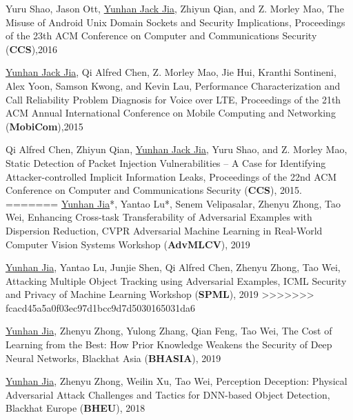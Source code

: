 \documentclass[margin]{res}
\begin{document}
\begin{resume}
Yuru Shao, Jason Ott, \underline{Yunhan Jack Jia}, Zhiyun Qian, and Z. Morley Mao,
The Misuse of Android Unix Domain Sockets and Security Implications, Proceedings of the 23th ACM Conference on Computer and Communications Security (\textbf{CCS}),2016 \href{http://web.eecs.umich.edu/\~jackjia/material/misuse\_ccs16.pdf}{\color{blue}{[PDF]}}

\underline{Yunhan Jack Jia}, Qi Alfred Chen, Z. Morley Mao, Jie Hui, Kranthi Sontineni, Alex Yoon, Samson Kwong, and Kevin Lau, Performance Characterization and Call Reliability Problem Diagnosis for Voice over LTE, Proceedings of the 21th ACM Annual International Conference on Mobile Computing and Networking (\textbf{MobiCom}),2015 \href{http://web.eecs.umich.edu/\~jackjia/material/performance\_mobicom15.pdf}{\color{blue}{[PDF]}}

Qi Alfred Chen, Zhiyun Qian, \underline{Yunhan Jack Jia}, Yuru Shao, and Z. Morley Mao, Static Detection of Packet Injection
Vulnerabilities -- A Case for Identifying Attacker-controlled Implicit Information Leaks, Proceedings of the 22nd ACM
Conference on Computer and Communications Security (\textbf{CCS}), 2015. \href{http://web.eecs.umich.edu/\~jackjia/material/static\_ccs15.pdf}{\color{blue}{[PDF]}}
=======
\underline{Yunhan Jia}*, Yantao Lu*, Senem Velipasalar, Zhenyu Zhong, Tao Wei, Enhancing Cross-task Transferability of Adversarial Examples with Dispersion Reduction, CVPR Adversarial Machine Learning in Real-World Computer Vision Systems Workshop (\textbf{AdvMLCV}), 2019 \href{https://arxiv.org/pdf/1905.03333.pdf}{\color{blue}{[PDF]}}


\underline{Yunhan Jia}, Yantao Lu, Junjie Shen, Qi Alfred Chen, Zhenyu Zhong, Tao Wei,
Attacking Multiple Object Tracking using Adversarial Examples, ICML Security and Privacy of Machine Learning Workshop (\textbf{SPML}), 2019 \href{https://github.com/jiayunhan/jiayunhan.github.io/blob/master/material/fooling_spml19.pdf}{\color{blue}{[Poster]}}
>>>>>>> fcacd45a5a0f03ec97d1bcc9d7d5030165031da6

\underline{Yunhan Jia}, Zhenyu Zhong, Yulong Zhang, Qian Feng, Tao Wei,
The Cost of Learning from the Best: How Prior Knowledge Weakens the Security of Deep Neural Networks, Blackhat Asia (\textbf{BHASIA}), 2019 \href{http://i.blackhat.com/asia-19/Thu-March-28/bh-asia-Jia-the-Cost-of-Learning-From-the-Best-How-Prior-Knowledge-Weakens-the-Security-of-Deep-Neural-Networks.pdf}{\color{blue}{[Slides]}}

\underline{Yunhan Jia}, Zhenyu Zhong, Weilin Xu, Tao Wei,
Perception Deception: Physical Adversarial Attack Challenges and Tactics for DNN-based Object Detection, Blackhat Europe (\textbf{BHEU}), 2018 \href{http://i.blackhat.com/eu-18/Thu-Dec-6/eu-18-Zhong-Perception-Deception-Physical-Adversarial-Attack-Challenges-and-Tactics-for-DNN-Based-Object-Detection.pdf}{\color{blue}{[Slides]}}


\end{resume}
\end{document}
